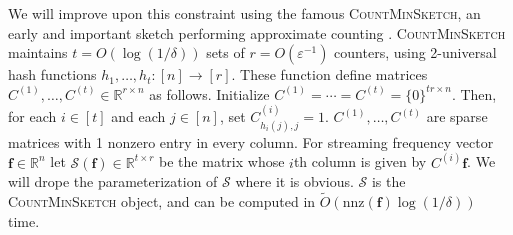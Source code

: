 \documentclass[10]{report}
\newcommand{\algoname}[1]{\textnormal{\textsc{#1}}}
\newcommand{\nnz}{\mathrm{nnz}}
\begin{document}
We will improve upon this constraint using the famous \algoname{CountMinSketch}, an early and important sketch performing approximate counting \cite{cormode2005improved}. 
\algoname{CountMinSketch} maintains 
$t = O(\log (1/\delta))$ sets of 
$r = O(\varepsilon^{-1})$ counters, using 2-universal hash functions $h_1, \dots, h_t: [n] \rightarrow [r]$.
These function define matrices $C^{(1)}, \dots, C^{(t)} \in \mathbb{R}^{r \times n}$ as follows.
Initialize $C^{(1)} = \cdots = C^{(t)} = \{0\}^{tr \times n}$.
Then, for each $i \in [t]$ and each $j \in [n]$, set $C^{(i)}_{h_i(j),j} = 1$. 
$C^{(1)}, \dots, C^{(t)}$ are sparse matrices with 1 nonzero entry in every column. 
For streaming frequency vector $\mathbf{f} \in \mathbb{R}^n$ let $\mathcal{S}(\mathbf{f}) \in \mathbb{R}^{t \times r}$ be the matrix whose $i$th column is given by $C^{(i)}\mathbf{f}$.
We will drope the parameterization of $\mathcal{S}$ where it is obvious.
$\mathcal{S}$ is the \algoname{CountMinSketch} object, and can be computed in $\widetilde{O}(\nnz(\mathbf{f}) \log (1 /\delta))$ time. 
\end{document}
